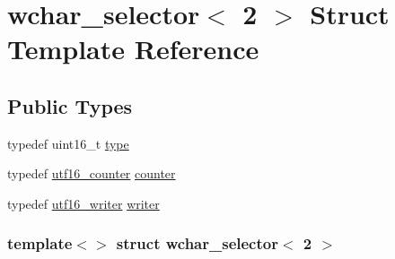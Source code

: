 \hypertarget{structwchar__selector_3_012_01_4}{
\section{wchar\_\-selector$<$ 2 $>$ Struct Template Reference}
\label{structwchar__selector_3_012_01_4}
}
\subsection*{Public Types}
\begin{DoxyCompactItemize}
\item 
typedef uint16\_\-t \hyperlink{structwchar__selector_3_012_01_4_a60517f9b159ad60977ca7c3d2739c168}{type}
\item 
typedef \hyperlink{structutf16__counter}{utf16\_\-counter} \hyperlink{structwchar__selector_3_012_01_4_a108682c81b16127f3bec2501f02cb9d8}{counter}
\item 
typedef \hyperlink{structutf16__writer}{utf16\_\-writer} \hyperlink{structwchar__selector_3_012_01_4_af84979f9b8cd883798fe4e99820d6073}{writer}
\end{DoxyCompactItemize}
\subsubsection*{template$<$$>$ struct wchar\_\-selector$<$ 2 $>$}



